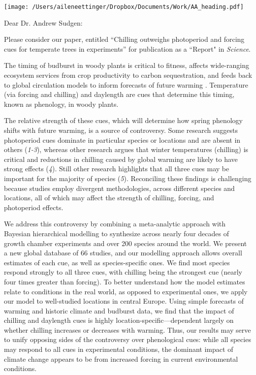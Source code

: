 \documentclass[11pt,a4paper]{letter}
\begin{document}


\begin{letter}{}
\texttt{[image: /Users/aileneettinger/Dropbox/Documents/Work/AA\_heading.pdf]}

\opening{Dear Dr. Andrew Sudgen:}
Please consider our paper, entitled ``Chilling outweighs photoperiod and forcing cues for temperate trees in experiments'' for publication as a ``Report" in \emph{Science}. 
\par The timing of budburst in woody plants is critical to fitness, affects wide-ranging ecosystem services from crop productivity to carbon sequestration, and feeds back to global circulation models to inform forecasts of future warming . Temperature (via forcing and chilling) and daylength are cues that determine this timing, known as phenology, in woody plants. 

\par The relative strength of these cues, which will determine how spring phenology shifts with future warming, is a source of controversy. Some research suggests photoperiod cues dominate in particular species or locations and are absent in others (\emph{1-3}), whereas other research argues that winter temperatures (chilling) is critical and reductions in chilling caused by global warming are likely to have strong effects (\emph{4}). Still other research highlights that all three cues may be important for the majority of species (\emph{5}). Reconciling these findings is challenging because studies employ divergent methodologies, across different species and locations, all of which may affect the strength of chilling, forcing, and photoperiod effects.

\par We address this controversy by combining a meta-analytic approach with Bayesian hierarchical modelling to synthesize across nearly four decades of growth chamber experiments and over 200 species around the world. We present a new global database of 66 studies, and our modelling approach allows overall estimates of each cue, as well as species-specific ones. We find most species respond strongly to all three cues, with chilling being the strongest cue (nearly four times greater than forcing). To better understand how the model estimates relate to conditions in the real world, as opposed to experimental ones, we apply our model to well-studied locations in central Europe. Using simple forecasts of warming and historic climate and budburst data, we find that the impact of chilling and daylength cues is highly location-specific---dependent largely on whether chilling increases or decreases with warming. Thus, our results may serve to unify opposing sides of the controversy over phenological cues: while all species may respond to all cues in experimental conditions, the dominant impact of climate change appears to be from increased forcing in current environmental conditions. 


\end{letter}
\end{document}
